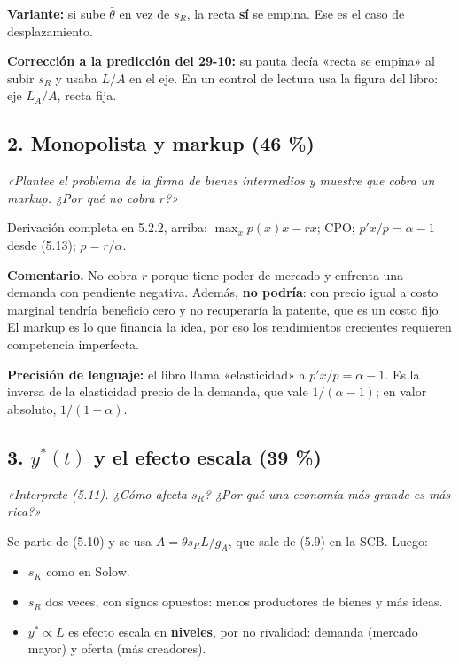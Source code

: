\documentclass[11pt,a4paper]{article}
\begin{document}
\textbf{Variante:} si sube $\bar\theta$ en vez de $s_R$, la recta \textbf{sí} se empina. Ese es el caso de desplazamiento.

\textbf{Corrección a la predicción del 29-10:} su pauta decía «recta se empina» al subir $s_R$ y usaba $L/A$ en el eje. En un control de lectura usa la figura del libro: eje $L_A/A$, recta fija.

\subsection*{2. Monopolista y markup (46 \%)}

\emph{«Plantee el problema de la firma de bienes intermedios y muestre que cobra un markup. ¿Por qué no cobra $r$?»}

Derivación completa en 5.2.2, arriba: $\max_x p(x)x - rx$; CPO; $p'x/p = \alpha - 1$ desde (5.13); $p = r/\alpha$.

\textbf{Comentario.} No cobra $r$ porque tiene poder de mercado y enfrenta una demanda con pendiente negativa. Además, \textbf{no podría}: con precio igual a costo marginal tendría beneficio cero y no recuperaría la patente, que es un costo fijo. El markup es lo que financia la idea, por eso los rendimientos crecientes requieren competencia imperfecta.

\textbf{Precisión de lenguaje:} el libro llama «elasticidad» a $p'x/p = \alpha - 1$. Es la inversa de la elasticidad precio de la demanda, que vale $1/(\alpha-1)$; en valor absoluto, $1/(1-\alpha)$.

\subsection*{3. $y^*(t)$ y el efecto escala (39 \%)}

\emph{«Interprete (5.11). ¿Cómo afecta $s_R$? ¿Por qué una economía más grande es más rica?»}

Se parte de (5.10) y se usa $A = \bar\theta s_R L/g_A$, que sale de (5.9) en la SCB. Luego:

\begin{itemize}[leftmargin=*,itemsep=2pt,topsep=2pt]
\item $s_K$ como en Solow.
\item $s_R$ dos veces, con signos opuestos: menos productores de bienes y más ideas.
\item $y^* \propto L$ es efecto escala en \textbf{niveles}, por no rivalidad: demanda (mercado mayor) y oferta (más creadores).
\end{itemize}
\end{document}
